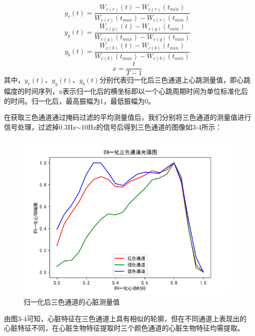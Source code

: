\begin{equation}
    y_r(t)=\frac{W_{c(r)}(t)- W_{c(r)}(t_{min})}{ W_{c(r)}(t_{max})- W_{c(r)}(t_{min})}	
\end{equation}
\begin{equation}
    y_g(t)=\frac{W_{c(g)}(t)- W_{c(g)}(t_{min})}{ W_{c(g)}(t_{max})- W_{c(g)}(t_{min})}
\end{equation}
\begin{equation}
    y_b(t)=\frac{W_{c(b)}(t)- W_{c(b)}(t_{min})}{ W_{c(b)}(t_{max})- W_{c(b)}(t_{min})}
\end{equation}
\begin{equation}
    x=\frac{t}{T-1}
\end{equation}
{其中，$ y_r(t)$、$ y_g(t)$、$ y_b(t)$分别代表归一化后三色通道上心跳测量值，即心跳幅度的时间序列，x表示归一化后的横坐标即以一个心跳周期时间为单位标准化后的时间。归一化后，最高振幅为1，最低振幅为0。}
\par
{在获取三色通道通过掩码过滤的平均测量值后，我们分别将三色通道的测量值进行信号处理，过滤掉0.3Hz$\sim$10Hz的信号后得到三色通道的图像如3-4所示：}
\begin{figure}[H]
  \centering
  \includegraphics[width=0.65\linewidth]{images/Figure_36.png}
  \caption{归一化后三色通道的心脏测量值}\label{3-5} %
\end{figure}
\par
{由图3-4可知，心脏特征在三色通道上具有相似的轮廓，但在不同通道上表现出的心脏特征不同，在心脏生物特征提取时三个颜色通道的心脏生物特征均需提取。}

%
%
%
%
%
%
